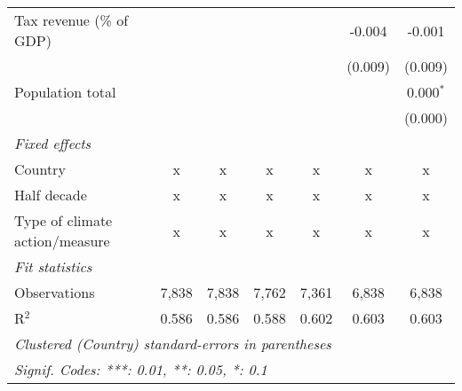 \begin{tabular}{lcccccc}
   Tax revenue (\% of GDP)              &         &              &               &               & -0.004        & -0.001\\   
                                        &         &              &               &               & (0.009)       & (0.009)\\   
   Population total                     &         &              &               &               &               & 0.000$^{*}$\\   
                                        &         &              &               &               &               & (0.000)\\   
   \emph{Fixed effects}\\
   Country                              & x       & x            & x             & x             & x             & x\\  
   Half decade                          & x       & x            & x             & x             & x             & x\\  
   Type of climate action/measure       & x       & x            & x             & x             & x             & x\\  
   \midrule \emph{Fit statistics}\\
   Observations                         & 7,838   & 7,838        & 7,762         & 7,361         & 6,838         & 6,838\\  
   R$^2$                                & 0.586   & 0.586        & 0.588         & 0.602         & 0.603         & 0.603\\  
   \midrule
   \multicolumn{7}{l}{\emph{Clustered (Country) standard-errors in parentheses}}\\
   \multicolumn{7}{l}{\emph{Signif. Codes: ***: 0.01, **: 0.05, *: 0.1}}\\
\end{tabular}
\par\endgroup


